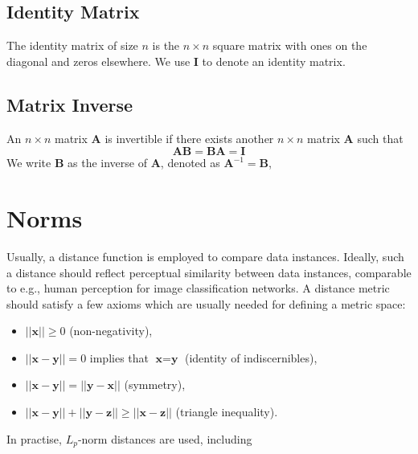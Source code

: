 \subsection*{Identity Matrix}

The identity matrix of size $n$ is the $n \times n$ square matrix with ones on the diagonal and zeros elsewhere. We use $\textbf{I}$ to denote an identity matrix. 

\subsection*{Matrix Inverse }

An $n\times n$ matrix $\textbf{A}$ is invertible if there exists another $n\times n$ matrix $\textbf{A}$ such that 
\begin{equation}
    \textbf{A}\textbf{B} = \textbf{B} \textbf{A} = \textbf{I}
\end{equation}
We write $\textbf{B}$ as the inverse of $\textbf{A}$, denoted as  $\textbf{A}^{-1}=\textbf{B}$, 


\section{Norms}\label{sec:norms}

Usually, a distance function is employed to compare data instances. Ideally, such a distance should reflect perceptual similarity between data instances, comparable to e.g., human perception for image classification networks. A distance metric should satisfy a few axioms which are usually needed for defining a metric space: 
\begin{itemize}
\item $||\textbf{x}||\geq 0$ (non-negativity),
\item $||\textbf{x}-\textbf{y}||=0$ implies that $\textbf{x} = \textbf{y}$ (identity of indiscernibles),
\item $||\textbf{x}-\textbf{y}|| = ||\textbf{y}-\textbf{x}||$ (symmetry),
\item $||\textbf{x}-\textbf{y}||+||\textbf{y}-\textbf{z}|| \geq ||\textbf{x}-\textbf{z}||$ (triangle inequality).
\end{itemize}

In practise, $L_p$-norm distances are used, including

